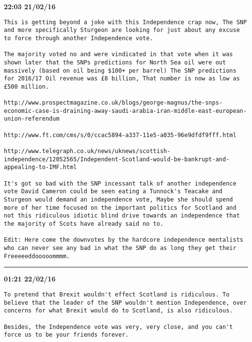\begin{adjustwidth}{0cm}{0cm}
\footnotesize \textbf{22:03 21/02/16}

\begin{lstlisting}[breaklines, breakatwhitespace, basicstyle=\small, frame=leftline]
This is getting beyond a joke with this Independence crap now, The SNP and more specifically Sturgeon are looking for just about any excuse to force through another Independence vote.

The majority voted no and were vindicated in that vote when it was  shown later that the SNPs predictions for North Sea oil were out massively (based on oil being $100+ per barrel) The SNP predictions for 2016/17 Oil revenue was £8 billion, That number is now as low as £500 million.

http://www.prospectmagazine.co.uk/blogs/george-magnus/the-snps-economic-case-is-draining-away-saudi-arabia-iran-middle-east-european-union-referendum

http://www.ft.com/cms/s/0/ccac5894-a337-11e5-a035-96e9dfdf9fff.html

http://www.telegraph.co.uk/news/uknews/scottish-independence/12052565/Independent-Scotland-would-be-bankrupt-and-appealing-to-IMF.html

It's got so bad with the SNP incessant talk of another independence vote David Cameron could be seen eating a Tunnock's Teacake and Sturgeon would demand an independence vote, Maybe she should spend more of her time focused on the important politics for Scotland and not this ridiculous idiotic blind drive towards an independence that the majority of Scots have already said no to.

Edit: Here come the downvotes by the hardcore independence mentalists who can never see any bad in what the SNP do as long they get their Freeeeeddooooommmm.
\end{lstlisting}
\end{adjustwidth}

\hrule%

\begin{adjustwidth}{2cm}{0cm}
\footnotesize \textbf{01:21 22/02/16}

\begin{lstlisting}[breaklines, breakatwhitespace, basicstyle=\small, frame=leftline]
To pretend that Brexit wouldn't effect Scotland is ridiculous. To believe that the leader of the SNP wouldn't mention Independence, over concerns for what Brexit would do to Scotland, is also ridiculous. 

Besides, the Independence vote was very, very close, and you can't force us to be your friends forever.
\end{lstlisting}
\end{adjustwidth}

